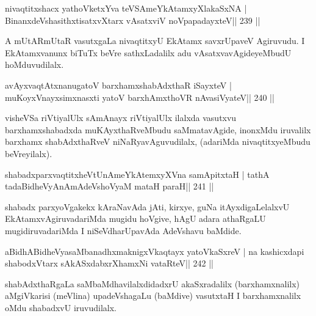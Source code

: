 \begin{shl}
nivaqtitxshacx yathoVketxYva teVSAmeYkAtamxyXlakaSxNA |
BinanxdeVshasithxtisatxvXtarx vAsatxviV noVpapadayxteV\hfill || 239 ||
\end{shl}

\begin{artha}
A mUtARmUtaR vasutxgaLa nivaqtitxyU EkAtamx savxrUpaveV Agiruvudu. I EkAtamxvanunx biTuTx beVre sathxLadalilx adu vAsatxvavAgideyeMbudU hoMduvudilalx.
\end{artha}


\begin{shl}
avAyxvaqtAtxnanugatoV barxhamxshabAdxthaR iSayxteV |
muKoyxV\s nayxsimxnasxti yatoV barxhAmxthoVR nAvasiVyateV\hfill || 240 ||
\end{shl}

\begin{artha}
visheVSa riVtiyalUlx sAmAnayx riVtiyalUlx ilalxda vasutxvu barxhamxshabadxda muKAyxthaRveMbudu saMmatavAgide, inonxMdu iruvalilx barxhamx shabAdxthaRveV niNaRyavAguvudilalx, (adariMda nivaqtitxyeMbudu beVreyilalx).
\end{artha}


\begin{shl}
shabadxparxvaqtitxheVtUnAmeYkAtemxyXVna samApitxtaH |
tathA tadaBidheVyAnAmAdeVshoV\s yaM mataH paraH\hfill || 241 ||
\end{shl}

\begin{artha}
shabadx parxyoVgakekx kAraNavAda jAti, kirxye, guNa itAyxdigaLelalxvU EkAtamxvAgiruvadariMda mugidu hoVgive, hAgU adara athaRgaLU mugidiruvadariMda I niSeVdharUpavAda AdeVshavu baMdide.
\end{artha}

\begin{shl}
aBidhABidheVyasaMbanadhxmaknigxVkaqtayx yatoV\s kaSxreV |
na kashicxdapi shabodxV\s tarx sAkASxdabxrXhamxNi vataRteV\hfill || 242 ||
\end{shl}

\begin{artha}
shabAdxthaRgaLa saMbaMdhavilalxdidadxrU akaSxradalilx (barxhamxnalilx) aMgiVkarisi (meVlina) upadeVshagaLu (baMdive) vasutxtaH I barxhamxnalilx oMdu shabadxvU iruvudilalx.
\end{artha}



